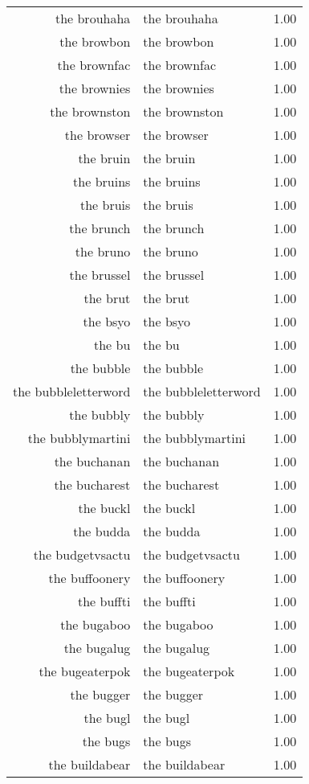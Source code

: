 \begin{table}[ht]
\begin{tabular}{rlr}
  the brouhaha & the brouhaha & 1.00 \\ 
  the browbon & the browbon & 1.00 \\ 
  the brownfac & the brownfac & 1.00 \\ 
  the brownies & the brownies & 1.00 \\ 
  the brownston & the brownston & 1.00 \\ 
  the browser & the browser & 1.00 \\ 
  the bruin & the bruin & 1.00 \\ 
  the bruins & the bruins & 1.00 \\ 
  the bruis & the bruis & 1.00 \\ 
  the brunch & the brunch & 1.00 \\ 
  the bruno & the bruno & 1.00 \\ 
  the brussel & the brussel & 1.00 \\ 
  the brut & the brut & 1.00 \\ 
  the bsyo & the bsyo & 1.00 \\ 
  the bu & the bu & 1.00 \\ 
  the bubble & the bubble & 1.00 \\ 
  the bubbleletterword & the bubbleletterword & 1.00 \\ 
  the bubbly & the bubbly & 1.00 \\ 
  the bubblymartini & the bubblymartini & 1.00 \\ 
  the buchanan & the buchanan & 1.00 \\ 
  the bucharest & the bucharest & 1.00 \\ 
  the buckl & the buckl & 1.00 \\ 
  the budda & the budda & 1.00 \\ 
  the budgetvsactu & the budgetvsactu & 1.00 \\ 
  the buffoonery & the buffoonery & 1.00 \\ 
  the buffti & the buffti & 1.00 \\ 
  the bugaboo & the bugaboo & 1.00 \\ 
  the bugalug & the bugalug & 1.00 \\ 
  the bugeaterpok & the bugeaterpok & 1.00 \\ 
  the bugger & the bugger & 1.00 \\ 
  the bugl & the bugl & 1.00 \\ 
  the bugs & the bugs & 1.00 \\ 
  the buildabear & the buildabear & 1.00 \\ 

\end{tabular}
\end{table}
